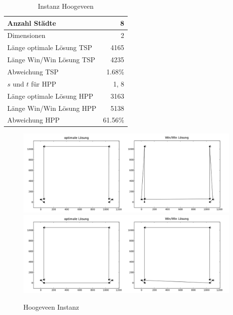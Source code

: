 \documentclass[11pt,a4paper]{article}
\begin{document}
\begin{table}[H]
        \centering
        \begin{tabular}{| l | r |}
            \hline
                Anzahl Städte               & 8             \\ \hline
                Dimensionen                 & 2             \\ \hline
                Länge optimale Lösung TSP   & 4165          \\ \hline
                Länge Win/Win Lösung  TSP   & 4235          \\ \hline
                Abweichung TSP              & 1.68\%        \\ \hline
                $s$ und $t$ für HPP         & 1, 8          \\ \hline
                Länge optimale Lösung HPP   & 3163          \\ \hline
                Länge Win/Win Lösung  HPP   & 5138          \\ \hline
                Abweichung HPP              & 61.56\%       \\ \hline
        \end{tabular}
        \caption{Instanz Hoogeveen}
        \label{tab:instanz_hoogeveen}
\end{table}

\begin{figure}[H]
        \centering
        \includegraphics[width=16cm]{gfx/hoogeveen_hpp_comparison}
        \includegraphics[width=16cm]{gfx/hoogeveen_tsp_comparison}
        \caption{Hoogeveen Instanz}
        \label{img:hoogeveen_comparison}
\end{figure}
\end{document}
